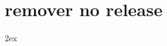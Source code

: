 \chapter{remover no release}
     \begingroup
     \parindent 0pt
     \parskip 2ex
     \def\enotesize{\normalsize}
     \theendnotes
     \endgroup
